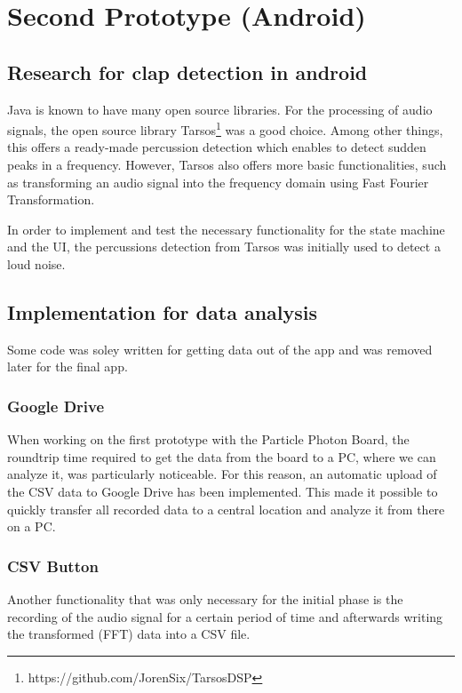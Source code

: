 \chapter{Second Prototype (Android)}
\label{sec:org11f3563}

\section{Research for clap detection in android}
\label{sec:orgc78ecb4}
Java is known to have many open source libraries. For the processing of audio
signals, the open source library Tarsos\footnote{https://github.com/JorenSix/TarsosDSP} was a good choice. Among other things, this offers a
ready-made percussion detection which enables to detect sudden peaks in a
frequency. However, Tarsos also offers more basic functionalities, such as
transforming an audio signal into the frequency domain using Fast Fourier
Transformation.

In order to implement and test the necessary functionality for the state machine
and the UI, the percussions detection from Tarsos was initially used to detect a
loud noise.

\section{Implementation for data analysis}
\label{sec:org29c2ba8}
Some code was soley written for getting data out of the app and was removed 
later for the final app.

\subsection{Google Drive}
\label{sec:orgfdfd3aa}
When working on the first prototype with the Particle Photon Board, the
roundtrip time required to get the data from the board to a PC, where we can
analyze it, was particularly noticeable. For this reason, an automatic upload of
the CSV data to Google Drive has been implemented. This made it possible to
quickly transfer all recorded data to a central location and analyze it from
there on a PC.
\subsection{CSV Button}
\label{sec:orgcc3314e}
Another functionality that was only necessary for the initial phase is the
recording of the audio signal for a certain period of time and afterwards
writing the transformed (FFT) data into a CSV file.

